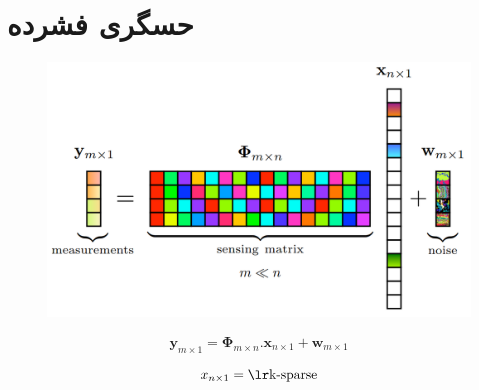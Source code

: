 \FloatBarrier
\section{حسگری فشرده}\label{ch:background|sec:compresed-sensing}



\begin{figure}[t!]
	\centering
	\includegraphics[width=0.7\linewidth]{chapters/chapter-2/figs/compressed-sensig-general-settings}
	\caption{}
	\label{fig:compressed-sensig-general-settings}
\end{figure}



\begin{equation}
	\mathbf{y}_{m\times1} = \mathbf{\Phi}_{m\times n} . \mathbf{x}_{n\times1} + \mathbf{w}_{m\times1}
\end{equation}

\[x_{n\times1} = \lrtext{k-sparse}\]






